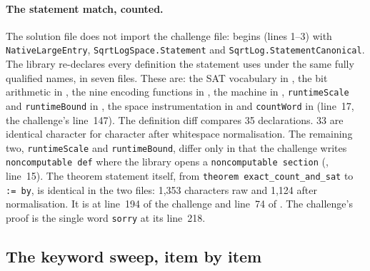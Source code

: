 \paragraph{The statement match, counted.} The solution file does not
import the challenge file:  begins
(lines 1--3) with \texttt{NativeLargeEntry}, \texttt{SqrtLogSpace.Statement}
and \texttt{SqrtLog.StatementCanonical}. The library re-declares every
definition the statement uses under the same fully qualified names, in
seven files. These are: the SAT vocabulary in , the bit
arithmetic in , the nine encoding
functions in , the machine in
, \texttt{runtimeScale} and
\texttt{runtimeBound} in , the
space instrumentation in  and
\texttt{countWord} in 
(line~17, the challenge's line~147). The definition diff compares 35
declarations. 33 are identical character for character after whitespace
normalisation. The remaining two, \texttt{runtimeScale} and
\texttt{runtimeBound}, differ only in that the challenge writes
\texttt{noncomputable def} where the library opens a
\texttt{noncomputable section} (,
line~15). The theorem statement itself, from \texttt{theorem
exact\_count\_and\_sat} to \texttt{:= by}, is identical in the two files:
1,353 characters raw and 1,124 after normalisation. It is at line~194 of the
challenge and line~74 of . The
challenge's proof is the single word \texttt{sorry} at its line~218.

\subsection{The keyword sweep, item by item}
\label{app:tech-keywords}

